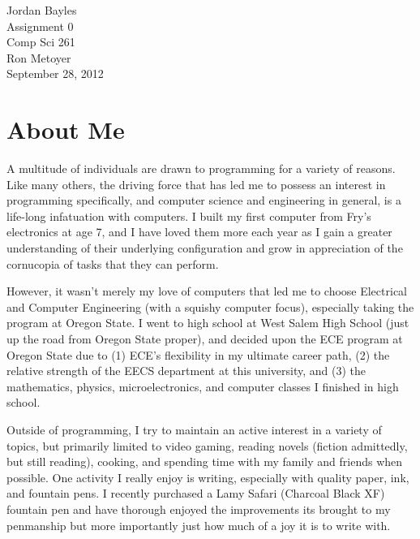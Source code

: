 \documentclass[12pt,letterpaper]{article}
\author{Jordan Bayles}
\title{}
\begin{document}

\begin{flushright}
Jordan Bayles \\
Assignment 0 \\
Comp Sci 261\\
Ron Metoyer \\
September 28, 2012
\end{flushright}

\section{About Me}

A multitude of individuals are drawn to programming for a variety of reasons.
Like many others, the driving force that has led me to possess an interest
in programming specifically, and computer science and engineering in general,
is a life-long infatuation with computers. I built my first computer from
Fry's electronics at age 7, and I have loved them more each year as I gain
a greater understanding of their underlying configuration and grow
in appreciation of the cornucopia of tasks that they can perform.

However, it wasn't merely my love of computers that led me to choose Electrical
and Computer Engineering (with a squishy computer focus), especially taking
the program at Oregon State. I went to high school at West Salem High School
(just up the road from Oregon State proper), and decided upon the ECE program
at Oregon State due to (1) ECE's flexibility in my ultimate career path, (2)
the relative strength of the EECS department at this university, and (3) the
mathematics, physics, microelectronics, and computer classes I finished in
high school.

Outside of programming, I try to maintain an active interest in a variety of
topics, but primarily limited to video gaming, reading novels (fiction admittedly,
but still reading), cooking, and spending time with my family and friends when
possible. One activity I really enjoy is writing, especially with quality paper,
ink, and fountain pens. I recently purchased a Lamy Safari (Charcoal Black XF)
fountain pen and have thorough enjoyed the improvements its brought to my
penmanship but more importantly just how much of a joy it is to write with.
\end{document}
